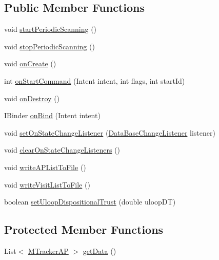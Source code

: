 \subsection*{Public Member Functions}
\begin{DoxyCompactItemize}
\item 
void \hyperlink{classeu_1_1uloop_1_1mobilitytracker_1_1MTrackerService_a770db9d563bd7c56b2950fc50786832c}{start\+Periodic\+Scanning} ()
\item 
void \hyperlink{classeu_1_1uloop_1_1mobilitytracker_1_1MTrackerService_a046b54f3843bc8aceb2bf9869d103918}{stop\+Periodic\+Scanning} ()
\item 
void \hyperlink{classeu_1_1uloop_1_1mobilitytracker_1_1MTrackerService_aad15cdef47d25b7dad3f2fc13254bf15}{on\+Create} ()
\item 
int \hyperlink{classeu_1_1uloop_1_1mobilitytracker_1_1MTrackerService_a65dde672e32aaec79b26219c2f179643}{on\+Start\+Command} (Intent intent, int flags, int start\+Id)
\item 
void \hyperlink{classeu_1_1uloop_1_1mobilitytracker_1_1MTrackerService_a60a7047b1633b7809af6e69beb420c40}{on\+Destroy} ()
\item 
I\+Binder \hyperlink{classeu_1_1uloop_1_1mobilitytracker_1_1MTrackerService_a24bdd6039581d524211d4f4d92adb70e}{on\+Bind} (Intent intent)
\item 
void \hyperlink{classeu_1_1uloop_1_1mobilitytracker_1_1MTrackerService_a5332e648f938ae1255c4b12aa0d82054}{set\+On\+State\+Change\+Listener} (\hyperlink{interfaceeu_1_1uloop_1_1mobilitytracker_1_1DataBaseChangeListener}{Data\+Base\+Change\+Listener} listener)
\item 
void \hyperlink{classeu_1_1uloop_1_1mobilitytracker_1_1MTrackerService_a5f1b2bb03919db654a59d69681a575e7}{clear\+On\+State\+Change\+Listeners} ()
\item 
void \hyperlink{classeu_1_1uloop_1_1mobilitytracker_1_1MTrackerService_a494c3da30f037844d0636ba505e8b40f}{write\+A\+P\+List\+To\+File} ()
\item 
void \hyperlink{classeu_1_1uloop_1_1mobilitytracker_1_1MTrackerService_a9688b6a2da0c9e673d4a71e261b6496b}{write\+Visit\+List\+To\+File} ()
\item 
boolean \hyperlink{classeu_1_1uloop_1_1mobilitytracker_1_1MTrackerService_a437ec1fb6cdc9b80f09afb76508f74fc}{set\+Uloop\+Dispositional\+Trust} (double uloop\+D\+T)
\end{DoxyCompactItemize}
\subsection*{Protected Member Functions}
\begin{DoxyCompactItemize}
\item 
List$<$ \hyperlink{classeu_1_1uloop_1_1mobilitytracker_1_1MTrackerAP}{M\+Tracker\+A\+P} $>$ \hyperlink{classeu_1_1uloop_1_1mobilitytracker_1_1MTrackerService_ace7c25f76f1ec7b2cfc4e5a4b28f68e9}{get\+Data} ()
\end{DoxyCompactItemize}
